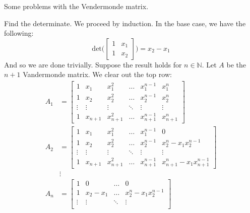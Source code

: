 \documentclass{article}                                                        %
\begin{document}
    \begin{problem}
        Some problems with the Vendermonde matrix.
    \end{problem}
    \begin{solution}
        Find the determinate. We proceed by induction. In the base case, we have
        the following:
        \begin{equation}
            \textrm{det}\Big(
                \begin{bmatrix}
                    1&x_{1}\\
                    1&x_{2}
                \end{bmatrix}
            \Big)=
            x_{2}-x_{1}
        \end{equation}
        And so we are done trivially. Suppose the result holds for
        $n\in\mathbb{N}$. Let $A$ be the $n+1$ Vandermonde matrix. We clear out
        the top row:
        \begin{align}
            A_{1}&=
            \begin{bmatrix}
                1&x_{1}&x_{1}^{2}&\dots&x_{1}^{n-1}&x_{1}^{n}\\
                1&x_{2}&x_{2}^{2}&\dots&x_{2}^{n-1}&x_{2}^{n}\\
                \vdots&\vdots&\vdots&\ddots&\vdots&\vdots\\
                1&x_{n+1}&x_{n+1}^{2}&\dots&x_{n+1}^{n-1}&x_{n+1}^{n}
            \end{bmatrix}\\
            A_{2}&=
            \begin{bmatrix}
                1&x_{1}&x_{1}^{2}&\dots&x_{1}^{n-1}&0\\
                1&x_{2}&x_{2}^{2}&\dots&x_{2}^{n-1}&x_{2}^{n}-x_{1}x_{2}^{n-1}\\
                \vdots&\vdots&\vdots&\ddots&\vdots&\vdots\\
                1&x_{n+1}&x_{n+1}^{2}&\dots&x_{n+1}^{n-1}
                    &x_{n+1}^{n}-x_{1}x_{n+1}^{n-1}
            \end{bmatrix}\\
            &\vdots\\
            A_{n}&=
            \begin{bmatrix}
                1&0&\dots&0\\
                1&x_{2}-x_{1}&\dots&x_{2}^{n}-x_{1}x_{2}^{n-1}\\
                \vdots&\vdots&\ddots&\vdots\\

\end{bmatrix}
\end{align}
\end{solution}
\end{document}

